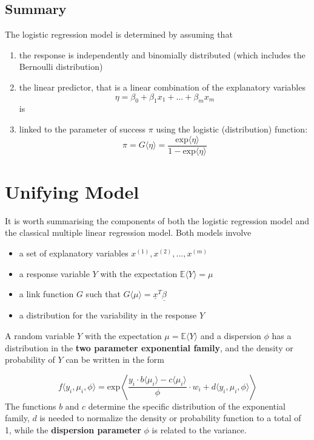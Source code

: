 \documentclass[11pt]{article}
\begin{document}
\subsection{Summary}
The logistic regression model is determined by assuming that
\begin{enumerate}
	\item the response is independently and binomially distributed (which includes the Bernoulli distribution)
	\item the linear predictor, that is a linear combination of the explanatory variables
	\begin{equation*}
		\eta = \beta_0 + \beta_1 x_1 + ... + \beta_m x_m
	\end{equation*}
	is
	\item linked to the parameter of success $\pi$ using the logistic (distribution) function:
	\begin{equation*}
		\pi = G\langle\eta\rangle = \frac{\text{exp}\langle \eta \rangle}{1 - \text{exp}\langle \eta \rangle}
	\end{equation*}
\end{enumerate}

\section{Unifying Model}

It is worth summarising the components of both the logistic regression model and the classical multiple linear regression model.
Both models involve
\begin{itemize}
	\item a set of explanatory variables $x^{(1)},x^{(2)},...,x^{(m)}$
	\item a response variable $Y$ with the expectation $\mathbb{E}\langle Y \rangle = \mu$
	\item a link function $G$ such that $G\langle\mu\rangle=\underline{x}^T\underline{\beta}$
	\item a distribution for the variability in the response $Y$
\end{itemize}

A random variable $Y$ with the expectation $\mu = \mathbb{E}\langle Y\rangle$ and a dispersion $\phi$ has a distribution in the \textbf{two parameter exponential family}, and the density or probability of $Y$ can be written in the form

\begin{equation*}
	f\langle y_i, \mu_i, \phi\rangle = \text{exp}\left\langle\frac{y_i\cdot b\langle\mu_i\rangle - c\langle \mu_i\rangle}{\phi}\cdot w_i + d\langle y_i, \mu_i, \phi\rangle\right\rangle
\end{equation*}
\noindent
The functions $b$ and $c$ determine the specific distribution of the exponential family, $d$ is needed to normalize the density or probability function to a total of 1, while the \textbf{dispersion parameter} $\phi$ is related to the variance.
\end{document}
